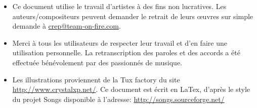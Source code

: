 \vspace{1cm}

\begin{itemize}
\item Ce document utilise le travail d'artistes à des fins non
  lucratives. Les auteurs/compositeurs peuvent demander le retrait de
  leurs \oe{}uvres sur simple demande à \url{crep@team-on-fire.com}.
\item Merci à tous les utilisateurs de respecter leur travail et d'en
  faire une utilisation personnelle. La retranscription des paroles et
  des accords a été effectuée bénévolement par des passionnés de
  musique.
\item Les illustrations proviennent de la Tux factory du site
  \url{http://www.crystalxp.net/}. Ce document est écrit en LaTex,
  d'après le style du projet Songs disponible à l'adresse:
  \url{http://songs.sourceforge.net/}
\end{itemize}

\vspace{1cm}
